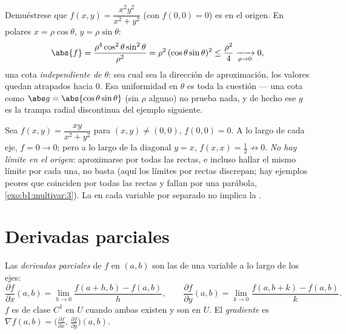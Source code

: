 \begin{example}
\label{ex:b1:multivar:polarbound}
Demuéstrese que $f(x, y) = \dfrac{x^2y^2}{x^2 + y^2}$ (con $f(0,0) =
0$) es  en el origen. En  polares $x =
\rho\cos\theta$, $y = \rho\sin\theta$:
\[
\abs{f} = \frac{\rho^4\cos^2\theta\sin^2\theta}{\rho^2}
= \rho^2\,(\cos\theta\sin\theta)^2 \leq \frac{\rho^2}{4}
\xrightarrow[\rho \to 0]{} 0 ,
\]
una cota \emph{independiente de $\theta$}: sea cual sea la dirección
de aproximación, los valores quedan atrapados hacia $0$. Esa uniformidad en
$\theta$ es toda la cuestión --- una cota como $\abs g =
\abs{\cos\theta\sin\theta}$ (sin $\rho$ alguno) no prueba nada,
y de hecho ese $g$ es la trampa radial discontinua del
ejemplo siguiente.
\end{example}

\begin{example}\label{ex:b1:multivar:trap}
Sea $f(x, y) = \dfrac{xy}{x^2 + y^2}$ para $(x,y) \neq (0,0)$, $f(0,
0) = 0$. A lo largo de cada eje, $f = 0 \to 0$; pero a lo largo de la diagonal $y
= x$, $f(x, x) = \frac12 \not\to 0$. \emph{No hay límite en el origen}:
aproximarse por todas las rectas, e incluso hallar el mismo límite por
cada una, no basta (aquí los límites por rectas discrepan; hay ejemplos peores
que coinciden por todas las rectas y fallan por una parábola,
\cref{exo:b1:multivar:3}). La  en cada variable por separado
no implica la .
\end{example}

\section{Derivadas parciales}

\begin{definition}\label{def:b1:multivar:partial}
Las \emph{derivadas parciales} de $f$ en
$(a, b)$ son las  de una variable a lo largo de los ejes:
\[
\frac{\partial f}{\partial x}(a,b)
= \lim_{h \to 0} \frac{f(a + h, b) - f(a,b)}{h},
\qquad
\frac{\partial f}{\partial y}(a,b)
= \lim_{k \to 0} \frac{f(a, b + k) - f(a,b)}{k}.
\]
$f$ es de clase $C^1$ en $U$ cuando ambas existen y son  en
$U$. El \emph{gradiente} es $\nabla f(a,b) =
\bigl(\frac{\partial f}{\partial x},\, \frac{\partial f}{\partial
y}\bigr)(a,b)$.
\end{definition}

